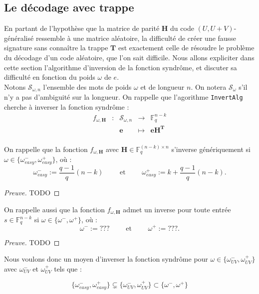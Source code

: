 \documentclass[12pt]{article}
\theoremstyle{plain}
\newcommand{\F}{\mathbb{F}}
\begin{document}
\subsection{Le décodage avec trappe}

En partant de l'hypothèse que la matrice de parité $\mathbf{H}$ du code $(U,U+V)$-généralisé ressemble à une matrice aléatoire, la difficulté de créer une fausse signature sans connaître la trappe $\mathbf{T}$ est exactement celle de résoudre le problème du décodage d'un code aléatoire, que l'on sait difficile. Nous allons expliciter dans cette section l'algorithme d'inversion de la fonction syndrôme, et discuter sa difficulté en fonction du poids $\omega$ de $e$. \\

Notons $\mathcal{S}_{\omega,n}$ l'ensemble des mots de poids $\omega$ et de longueur $n$. On notera $\mathcal{S}_{\omega}$ s'il n'y a pas d'ambiguité sur la longueur. On rappelle que l'agorithme \verb|InvertAlg| cherche à inverser la fonction syndrôme : 
$$\begin{array}{ccccc}
f_{\omega,\mathbf{H}} & : & \mathcal{S}_{\omega,n} & \to & \F_q^{n-k} \\
 & & \mathbf{e} & \mapsto & \mathbf{eH^T} \\
\end{array}$$

On rappelle que la fonction $f_{\omega,\mathbf{H}}$ avec $\mathbf{H} \in \F_q^{(n-k)\times n}$ s'inverse génériquement si $\omega \in \{\omega_{easy}^-,\omega_{easy}^+\}$, où :
$$ \omega_{easy}^- := \frac{q-1}{q}(n-k) \qquad \text{ et }\qquad  \omega_{easy}^+ := k + \frac{q-1}{q}(n-k).$$

\begin{proof}[Preuve] TODO
\end{proof}


On rappelle aussi que la fonction $f_{\omega,\mathbf{H}}$ admet un inverse pour toute entrée $s \in \F_q^{n-k}$ si $\omega \in \{\omega^-,\omega^+\}$, où :
$$ \omega^- := ??? \qquad \text{ et }\qquad  \omega^+ := ???.$$

\begin{proof}[Preuve] TODO
\end{proof}


Nous voulons donc un moyen d'inverser la fonction syndrôme pour $\omega \in \{\omega_{UV}^-,\omega_{UV}^+\}$ avec $\omega_{UV}^-$ et $\omega_{UV}^+$ tels que :

$$\{\omega_{easy}^-,\omega_{easy}^+\} \subsetneq \{\omega_{UV}^-,\omega_{UV}^+\} \subset  \{\omega^-,\omega^+\}$$
\end{document}
